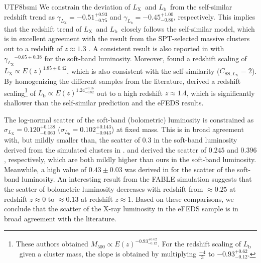 \documentclass[longauth]{aa}
\newcommand{\Mfiveoo}{\ensuremath{M_{500}}}
\newcommand{\redshift}{\ensuremath{z}}
\newcommand{\Ez}{\ensuremath{E(z)}}
\newcommand{\Lx}{\ensuremath{L_{\mathrm{X}}}}
\newcommand{\Lb}{\ensuremath{L_{\mathrm{b}}}}
\newcommand{\gammalx}{\ensuremath{\gamma_{L_{\mathrm{X}}}}}
\newcommand{\sigmalx}{\ensuremath{\sigma_{L_{\mathrm{X}}}}}
\newcommand{\gammalb}{\ensuremath{\gamma_{L_{\mathrm{b}}}}}
\newcommand{\sigmalb}{\ensuremath{\sigma_{L_{\mathrm{b}}}}}
\newcommand{\ansgammalx}{\ensuremath{ -0.51^{+0.93}_{-0.75} }}
\newcommand{\anssigmalx}{\ensuremath{ 0.120^{+0.138}_{-0.060} }}
\newcommand{\ansgammalb}{\ensuremath{ -0.45^{+1.00}_{-0.86} }}
\newcommand{\anssigmalb}{\ensuremath{ 0.102^{+0.143}_{-0.043} }}
\begin{document}
\begin{CJK*}{UTF8}{bsmi}
We constrain the deviation of \Lx\ and \Lb\ from the self-similar redshift trend as $\gammalx = \ansgammalx$ and $\gammalb = \ansgammalb$, respectively.
This implies that the redshift trend of \Lx\ and \Lb\ closely follows the self-similar model, which is in excellent agreement with the result from the SPT-selected massive clusters out to a redshift of $\redshift\approx1.3$ \citep{bulbul19}.
A consistent result is also reported in \cite{mantz16b} with $\gammalx^{-0.65\pm0.38}$ for the soft-band luminosity.
Moreover, \cite{vikhlinin09a} found a redshift scaling of $\Lx\propto E(\redshift)^{1.85\pm0.42}$, which is also consistent with the self-similarity ($C_{\mathrm{SS},\Lx} = 2$).
By homogenizing the different samples from the literature, \cite{reichert11} derived a redshift scaling\footnote{
These authors obtained $\Mfiveoo\propto {\Ez}^{-0.93^{+0.62}_{-0.12}}$. For the redshift scaling of \Lb\ given a cluster mass, the slope is obtained by multiplying $\frac{-4}{3}$ to $-0.93^{+0.62}_{-0.12}$.
}
of $\Lb\propto {\Ez}^{1.24^{+0.16}_{-0.82}}$ out to a high redshift $\redshift\approx1.4$, which is significantly shallower than the self-similar prediction and the eFEDS results.



The log-normal scatter of the soft-band (bolometric) luminosity is constrained as $\sigmalx = \anssigmalx$ ($\sigmalb = \anssigmalb$) at fixed mass.
This is in broad agreement with, but mildly smaller than, the scatter of $0.3$ in the soft-band luminosity derived from the simulated clusters in \cite{barnes17}.
\cite{lovisari15} and \cite{vikhlinin09a} derived the scatter of $0.245$ and $0.396$, respectively, which are both mildly higher than ours in the soft-band luminosity.
Meanwhile, a high value of $0.43\pm0.03$ was derived in \cite{mantz16b} for the scatter of the soft-band luminosity. 
An interesting result from the FABLE simulation \citep{henden19} suggests that the scatter of bolometric luminosity decreases with redshift from $\approx0.25$ at redshift $\redshift\approx0$ to $\approx0.13$ at redshift $\redshift\approx1$.
Based on these comparisons, we conclude that the scatter of the X-ray luminosity in the eFEDS sample is in broad agreement with the literature.



\end{CJK*}
\end{document}

